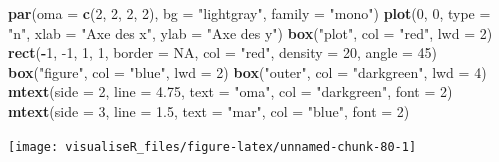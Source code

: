 \documentclass[]{article}
\newenvironment{Shaded}{\begin{snugshade}}{\end{snugshade}}
\newcommand{\DataTypeTok}[1]{\textcolor[rgb]{0.13,0.29,0.53}{#1}}
\newcommand{\DecValTok}[1]{\textcolor[rgb]{0.00,0.00,0.81}{#1}}
\newcommand{\FloatTok}[1]{\textcolor[rgb]{0.00,0.00,0.81}{#1}}
\newcommand{\KeywordTok}[1]{\textcolor[rgb]{0.13,0.29,0.53}{\textbf{#1}}}
\newcommand{\NormalTok}[1]{#1}
\newcommand{\OperatorTok}[1]{\textcolor[rgb]{0.81,0.36,0.00}{\textbf{#1}}}
\newcommand{\OtherTok}[1]{\textcolor[rgb]{0.56,0.35,0.01}{#1}}
\newcommand{\StringTok}[1]{\textcolor[rgb]{0.31,0.60,0.02}{#1}}
\begin{document}
\begin{Shaded}
\begin{Highlighting}[]
\KeywordTok{par}\NormalTok{(}\DataTypeTok{oma =} \KeywordTok{c}\NormalTok{(}\DecValTok{2}\NormalTok{, }\DecValTok{2}\NormalTok{, }\DecValTok{2}\NormalTok{, }\DecValTok{2}\NormalTok{), }\DataTypeTok{bg =} \StringTok{"lightgray"}\NormalTok{, }\DataTypeTok{family =} \StringTok{"mono"}\NormalTok{)}
\KeywordTok{plot}\NormalTok{(}\DecValTok{0}\NormalTok{, }\DecValTok{0}\NormalTok{, }\DataTypeTok{type =} \StringTok{"n"}\NormalTok{, }\DataTypeTok{xlab =} \StringTok{"Axe des x"}\NormalTok{, }\DataTypeTok{ylab =} \StringTok{"Axe des y"}\NormalTok{)}
\KeywordTok{box}\NormalTok{(}\StringTok{"plot"}\NormalTok{, }\DataTypeTok{col =} \StringTok{"red"}\NormalTok{, }\DataTypeTok{lwd =} \DecValTok{2}\NormalTok{)}
\KeywordTok{rect}\NormalTok{(}\OperatorTok{-}\DecValTok{1}\NormalTok{, }\DecValTok{-1}\NormalTok{, }\DecValTok{1}\NormalTok{, }\DecValTok{1}\NormalTok{, }\DataTypeTok{border =} \OtherTok{NA}\NormalTok{, }\DataTypeTok{col =} \StringTok{"red"}\NormalTok{, }\DataTypeTok{density =} \DecValTok{20}\NormalTok{, }\DataTypeTok{angle =} \DecValTok{45}\NormalTok{)}
\KeywordTok{box}\NormalTok{(}\StringTok{"figure"}\NormalTok{, }\DataTypeTok{col =} \StringTok{"blue"}\NormalTok{, }\DataTypeTok{lwd =} \DecValTok{2}\NormalTok{)}
\KeywordTok{box}\NormalTok{(}\StringTok{"outer"}\NormalTok{, }\DataTypeTok{col =} \StringTok{"darkgreen"}\NormalTok{, }\DataTypeTok{lwd =} \DecValTok{4}\NormalTok{)}
\KeywordTok{mtext}\NormalTok{(}\DataTypeTok{side =} \DecValTok{2}\NormalTok{, }\DataTypeTok{line =} \FloatTok{4.75}\NormalTok{, }\DataTypeTok{text =} \StringTok{"oma"}\NormalTok{, }\DataTypeTok{col =} \StringTok{"darkgreen"}\NormalTok{, }\DataTypeTok{font =} \DecValTok{2}\NormalTok{)}
\KeywordTok{mtext}\NormalTok{(}\DataTypeTok{side =} \DecValTok{3}\NormalTok{, }\DataTypeTok{line =} \FloatTok{1.5}\NormalTok{, }\DataTypeTok{text =} \StringTok{"mar"}\NormalTok{, }\DataTypeTok{col =} \StringTok{"blue"}\NormalTok{, }\DataTypeTok{font =} \DecValTok{2}\NormalTok{)}
\end{Highlighting}
\end{Shaded}

\begin{center}\texttt{[image: visualiseR\_files/figure-latex/unnamed-chunk-80-1]} \end{center}
\end{document}
